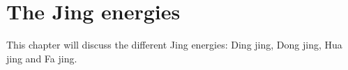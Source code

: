 \chapter{The Jing energies}\label{ch:jing}

This chapter will discuss the different Jing energies: Ding jing, Dong jing, Hua jing and Fa jing.